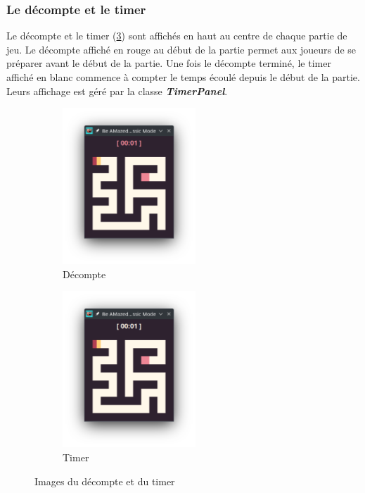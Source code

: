 \subsubsection*{Le décompte et le timer}

Le décompte et le timer (\ref{fig:CountdownAndTimer}) sont affichés en haut au centre de chaque partie de jeu. Le décompte affiché en rouge au début de la partie permet aux joueurs de se préparer avant le début de la partie. Une fois le décompte terminé, le timer affiché en blanc commence à compter le temps écoulé depuis le début de la partie. Leurs affichage est géré par la classe \textbf{\textit{TimerPanel}}.

\begin{figure}[!htb]%
    \centering
    \begin{subfigure}{5cm}
        \includegraphics[width=5cm]{ressources/Implementation/Labyrinthe/Vue/CountdownTimer/CountDown.png}%
        \caption{Décompte}
        \label{fig:Countdown}
    \end{subfigure}
    \qquad
    \begin{subfigure}{5cm}
        \includegraphics[width=5cm]{ressources/Implementation/Labyrinthe/Vue/CountdownTimer/Timer.png}%
        \caption{Timer}
        \label{fig:Timer}
    \end{subfigure}
    \caption{Images du décompte et du timer}%
    \label{fig:CountdownAndTimer}
\end{figure}
\FloatBarrier

